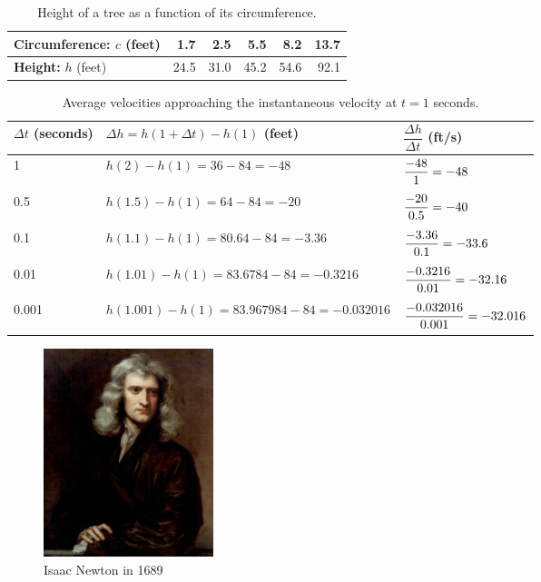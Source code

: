 \begin{enumerate}[label=(\alph*)]

\begin{table}[ht!]
\begin{centering}
\begin{tabular}{l*{5}{r}}
\toprule
{\bf Circumference:} $c$ (feet) & 1.7 & 2.5 & 5.5 & 8.2 & 13.7\tabularnewline
\midrule
{\bf Height:} $h$ (feet) & 24.5 & 31.0 & 45.2 & 54.6 & 92.1\tabularnewline
\bottomrule
\end{tabular}
\caption{Height of a tree as a function of its circumference.}
\label{tab:1-tree}
\end{centering}
\end{table}

\begin{table}[ht!]
\begin{centering}
\begin{tabular}{lll}
\toprule
$\Delta t$ (seconds) & $\Delta h = h(1+\Delta t)-h(1)$ (feet) & $\dfrac{\Delta h}{\Delta t}$ (ft/s) \\
\midrule
1       & $h(2) - h(1) = 36-84 = -48$                   & $\dfrac{-48\mathstrut}{1\mathstrut} = -48$ \\
0.5     & $h(1.5) - h(1) = 64-84 = -20$                 & $\dfrac{-20\mathstrut}{0.5\mathstrut} = -40$ \\
0.1     & $h(1.1) - h(1) = 80.64-84 = -3.36$            & $\dfrac{-3.36\mathstrut}{0.1\mathstrut} = -33.6$ \\
0.01    & $h(1.01) - h(1) = 83.6784-84 = -0.3216$       & $\dfrac{-0.3216\mathstrut}{0.01\mathstrut} = -32.16$ \\
0.001   & $h(1.001) - h(1) = 83.967984-84 = -0.032016$  & $\dfrac{-0.032016\mathstrut}{0.001\mathstrut} = -32.016$ \\
\bottomrule
\end{tabular}
\caption{Average velocities approaching the instantaneous velocity at $t=1$ seconds.}
\label{tab:2-2-tomato-velocity}
\end{centering}
\end{table}


\begin{figure}
  \vspace{-20pt}
  \centering
    \includegraphics[width=0.24\textwidth]{img/chap0/IsaacNewton.jpg}
\caption{Isaac Newton in 1689}
\vspace{-10pt}
\end{figure}


\end{enumerate}
